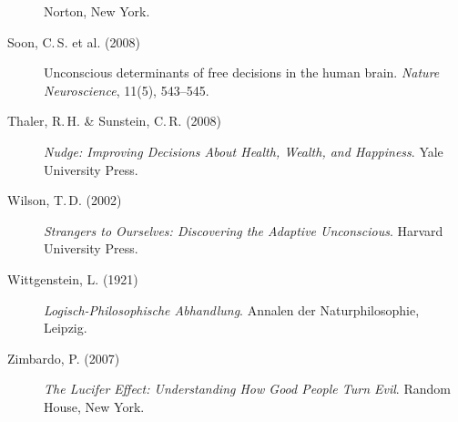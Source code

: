 ﻿\documentclass[12pt, a4paper]{article}
\begin{document}
\begin{description}
    Norton, New York.
  \item[Soon, C.\,S. et al. (2008)] Unconscious determinants of free decisions
    in the human brain. \textit{Nature Neuroscience}, 11(5), 543--545.
  \item[Thaler, R.\,H. \& Sunstein, C.\,R. (2008)] \textit{Nudge: Improving
    Decisions About Health, Wealth, and Happiness}. Yale University Press.
  \item[Wilson, T.\,D. (2002)] \textit{Strangers to Ourselves: Discovering the
    Adaptive Unconscious}. Harvard University Press.
  \item[Wittgenstein, L. (1921)] \textit{Logisch-Philosophische Abhandlung}.
    Annalen der Naturphilosophie, Leipzig.
  \item[Zimbardo, P. (2007)] \textit{The Lucifer Effect: Understanding How Good
    People Turn Evil}. Random House, New York.
\end{description}
\end{document}
